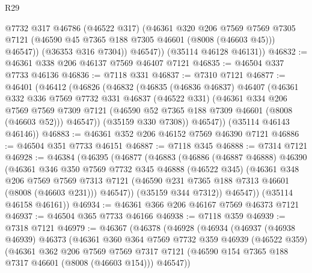 \begin{lexlean}{R29}
\begin{coremodule}
              @7732
              @317
              @46786
              (@46522 @317)
              (@46361
                @320
                @206
                @7569
                @7569
                @7305
                @7121
                (@46590 @45 @7365 @188 @7305 @46601 (@8008 (@46603 @45)))
                @46547))
            (@36353 @316 @7304))
          @46547))
      (@35114 @46128 @46131))
@46832 := @46361 @338 @206 @46137 @7569 @46407 @7121
@46835 := @46504 @337 @7733 @46136
@46836 := @7118 @331
@46837 := @7310 @7121
@46877 := @46401
    (@46412
      (@46826
        (@46832
          (@46835
            (@46836 @46837)
            @46407
            (@46361
              @332
              @336
              @7569
              @7732
              @331
              @46837
              (@46522 @331)
              (@46361
                @334
                @206
                @7569
                @7569
                @7309
                @7121
                (@46590 @52 @7365 @188 @7309 @46601 (@8008 (@46603 @52)))
                @46547))
            (@35159 @330 @7308))
          @46547))
      (@35114 @46143 @46146))
@46883 := @46361 @352 @206 @46152 @7569 @46390 @7121
@46886 := @46504 @351 @7733 @46151
@46887 := @7118 @345
@46888 := @7314 @7121
@46928 := @46384
    (@46395
      (@46877
        (@46883
          (@46886
            (@46887 @46888)
            @46390
            (@46361
              @346
              @350
              @7569
              @7732
              @345
              @46888
              (@46522 @345)
              (@46361
                @348
                @206
                @7569
                @7569
                @7313
                @7121
                (@46590 @231 @7365 @188 @7313 @46601 (@8008 (@46603 @231)))
                @46547))
            (@35159 @344 @7312))
          @46547))
      (@35114 @46158 @46161))
@46934 := @46361 @366 @206 @46167 @7569 @46373 @7121
@46937 := @46504 @365 @7733 @46166
@46938 := @7118 @359
@46939 := @7318 @7121
@46979 := @46367
    (@46378
      (@46928
        (@46934
          (@46937
            (@46938 @46939)
            @46373
            (@46361
              @360
              @364
              @7569
              @7732
              @359
              @46939
              (@46522 @359)
              (@46361
                @362
                @206
                @7569
                @7569
                @7317
                @7121
                (@46590 @154 @7365 @188 @7317 @46601 (@8008 (@46603 @154)))
                @46547))

\end{coremodule}
\end{lexlean}
